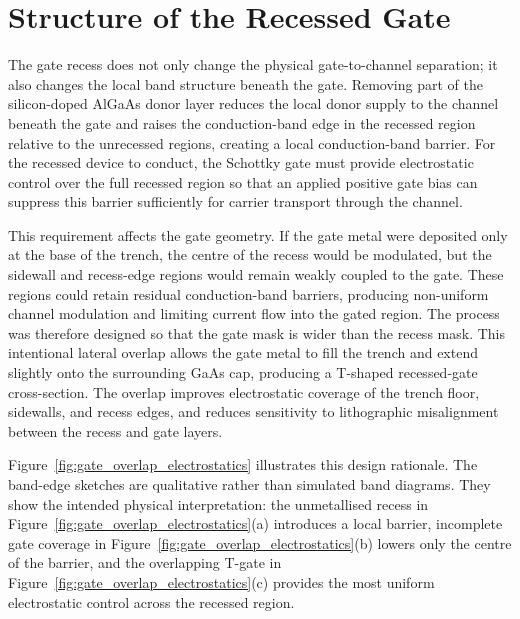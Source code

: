 

\FloatBarrier

\section{Structure of the Recessed Gate}

The gate recess does not only change the physical gate-to-channel separation;
it also changes the local band structure beneath the gate. Removing part of
the silicon-doped AlGaAs donor layer reduces the local donor supply to the
channel beneath the gate and raises the conduction-band edge in the recessed
region relative to the unrecessed regions, creating a local
conduction-band barrier. For the recessed device to conduct, the Schottky gate
must provide electrostatic control over the full recessed region so that an
applied positive gate bias can suppress this barrier sufficiently for carrier
transport through the channel.

\vspace{1mm}

This requirement affects the gate geometry. If the gate metal were deposited
only at the base of the trench, the centre of the recess would be modulated,
but the sidewall and recess-edge regions would remain weakly coupled to the
gate. These regions could retain residual conduction-band barriers, producing
non-uniform channel modulation and limiting current flow into the gated
region. The process was therefore designed so that the gate mask is wider
than the recess mask. This intentional lateral overlap allows the gate metal
to fill the trench and extend slightly onto the surrounding GaAs cap, producing a
T-shaped recessed-gate cross-section. The overlap improves electrostatic
coverage of the trench floor, sidewalls, and recess edges, and reduces
sensitivity to lithographic misalignment between the recess and gate layers.

\vspace{1mm}

Figure~\ref{fig:gate_overlap_electrostatics} illustrates this design
rationale. The band-edge sketches are qualitative rather than simulated band
diagrams. They show the intended physical interpretation: the unmetallised
recess in Figure~\ref{fig:gate_overlap_electrostatics}(a) introduces a local
barrier, incomplete gate coverage in
Figure~\ref{fig:gate_overlap_electrostatics}(b) lowers only the centre of the
barrier, and the overlapping T-gate in
Figure~\ref{fig:gate_overlap_electrostatics}(c) provides the most uniform
electrostatic control across the recessed region.

